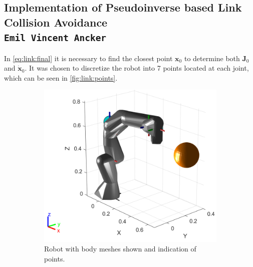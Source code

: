 \documentclass[../main.tex]{subfiles}
\begin{document}
\subsection{Implementation of Pseudoinverse based Link Collision Avoidance   \\ \normalfont\normalsize\texttt{Emil Vincent Ancker}}
In \autoref{eq:link:final} it is necessary to find the closest point $\boldsymbol{x}_0$ to determine both $\boldsymbol{J}_0$ and $\dot{\boldsymbol{x}}_0$. It was chosen to discretize the robot into 7 points located at each joint, which can be seen in \autoref{fig:link:points}.
\begin{figure}[H]
    \centering
    \begin{subfigure}[b]{0.48\textwidth}
        \centering
        \includegraphics[width=\textwidth]{figures/linkcollision/robot_points_vis.png}
        \caption{Robot with body meshes shown and indication of points.}
        \label{fig:link:points:withmesh}
    \end{subfigure}
    \hfill
    \begin{subfigure}[b]{0.48\textwidth}
        \centering

\end{subfigure}
\end{figure}
\end{document}
